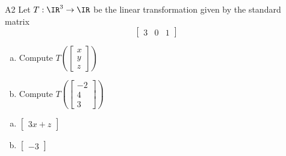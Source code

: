 \begin{problem}{A2}
Let $T: \IR^3 \rightarrow \IR$ be the linear transformation given by the standard matrix
$$\begin{bmatrix} 3 & 0 & 1 \end{bmatrix}$$
\begin{enumerate}[(a)]
\item Compute \( T\left( \begin{bmatrix}x\\ y \\ z  \end{bmatrix} \right) \)
\item Compute \( T\left( \begin{bmatrix} -2 \\ 4 \\ 3\end{bmatrix} \right) \)
\end{enumerate}
\end{problem}
\begin{solution}
\begin{enumerate}[(a)]
\item \(\begin{bmatrix} 3x+z  \end{bmatrix}\)
\item \(\begin{bmatrix} -3 \end{bmatrix}\)
\end{enumerate}
\end{solution}
